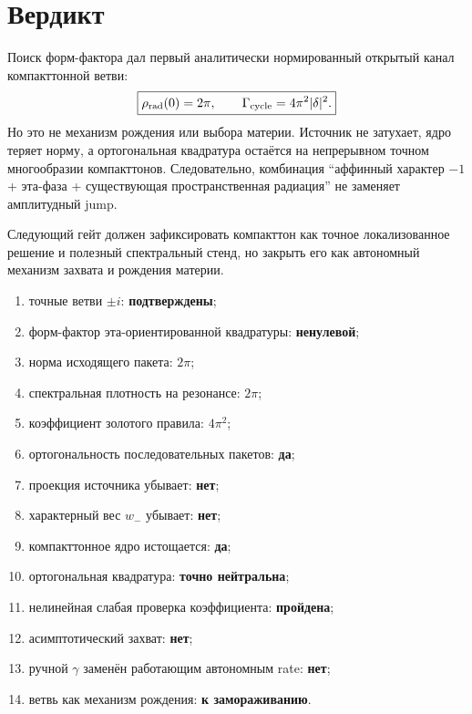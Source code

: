 \section{Вердикт}

Поиск форм-фактора дал первый аналитически нормированный открытый канал
компакттонной ветви:
\begin{equation}
 \boxed{\rho_{\rm rad}(0)=2\pi,
 \qquad \Gamma_{\rm cycle}=4\pi^2|\delta|^2.}
\end{equation}
Но это не механизм рождения или выбора материи. Источник не затухает,
ядро теряет норму, а ортогональная квадратура остаётся на непрерывном
точном многообразии компакттонов. Следовательно, комбинация
``аффинный характер $-1$ + эта-фаза + существующая пространственная
радиация'' не заменяет амплитудный jump.

Следующий гейт
должен зафиксировать компакттон как точное локализованное решение и
полезный спектральный стенд, но закрыть его как автономный механизм
захвата и рождения материи.

\begin{protocol}
\begin{enumerate}
 \item точные ветви $\pm i$: \textbf{подтверждены};
 \item форм-фактор эта-ориентированной квадратуры: \textbf{ненулевой};
 \item норма исходящего пакета: \textbf{$2\pi$};
 \item спектральная плотность на резонансе: \textbf{$2\pi$};
 \item коэффициент золотого правила: \textbf{$4\pi^2$};
 \item ортогональность последовательных пакетов: \textbf{да};
 \item проекция источника убывает: \textbf{нет};
 \item характерный вес $w_-$ убывает: \textbf{нет};
 \item компакттонное ядро истощается: \textbf{да};
 \item ортогональная квадратура: \textbf{точно нейтральна};
 \item нелинейная слабая проверка коэффициента: \textbf{пройдена};
 \item асимптотический захват: \textbf{нет};
 \item ручной $\gamma$ заменён работающим автономным rate:
 \textbf{нет};
 \item ветвь как механизм рождения: \textbf{к замораживанию}.
\end{enumerate}
\end{protocol}

